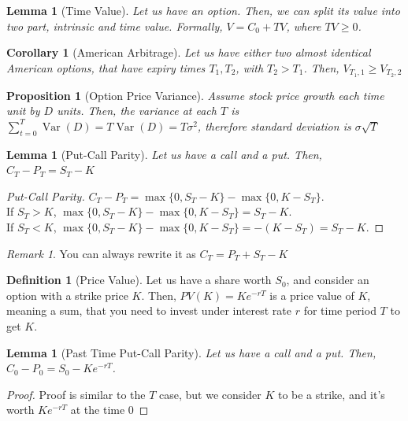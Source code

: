 \documentclass[11pt,a4paper]{article}
\theoremstyle{plain}
\newtheorem{lemma}[theorem]{Lemma}
\newtheorem{proposition}[theorem]{Proposition}
\newtheorem{corollary}[theorem]{Corollary}
\theoremstyle{definition}
\newtheorem{definition}[theorem]{Definition}
\theoremstyle{remark}
\newtheorem*{remark}{Remark}
\newcommand{\1}{\mathbf{1}}
\newcommand{\Var}{\operatorname{Var}}
\begin{document}
\begin{lemma}[Time Value]
  Let us have an option. Then, we can split its value into two part, intrinsic and time value. Formally, $V=C_0+TV$, where $TV\ge0$.
\end{lemma}

\begin{corollary}[American Arbitrage]
  Let us have either two almost identical American options, that have expiry times $T_1,T_2$, with $T_2>T_1$. Then, $V_{T_1,1}\ge V_{T_2,2}$
\end{corollary}

\begin{proposition}[Option Price Variance]
  Assume stock price growth each time unit by $D$ units. Then, the variance at each $T$ is $\sum\limits_{t=0}^T\Var(D)=T\Var(D)=T\sigma^2$, therefore standard deviation is $\sigma\sqrt{T}$
\end{proposition}

\begin{lemma}[Put-Call Parity]
  Let us have a call and a put. Then, $C_T-P_T=S_T-K$
\end{lemma}

\begin{proof}[Put-Call Parity]
  $C_T-P_T=\max\{0,S_T-K\}-\max\{0,K-S_T\}$.\\
  If $S_T>K$, $\max\{0,S_T-K\}-\max\{0,K-S_T\}=S_T-K$.\\
  If $S_T<K$, $\max\{0,S_T-K\}-\max\{0,K-S_T\}=-(K-S_T)=S_T-K$.
\end{proof}

\begin{remark}
  You can always rewrite it as $C_T=P_T+S_T-K$
\end{remark}

\begin{definition}[Price Value]
  Let us have a share worth $S_0$, and consider an option with a strike price $K$. Then, $PV(K)=Ke^{-rT}$ is a price value of $K$, meaning a sum, that you need to invest under interest rate $r$ for time period $T$ to get $K$.
\end{definition}

\begin{lemma}[Past Time Put-Call Parity]
  Let us have a call and a put. Then, $C_0-P_0=S_0-Ke^{-rT}$.
\end{lemma}

\begin{proof}
  Proof is similar to the $T$ case, but we consider $K$ to be a strike, and it's worth $Ke^{-rT}$ at the time $0$
\end{proof}
\end{document}
